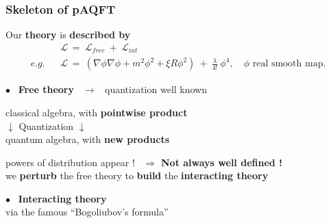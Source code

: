 \documentclass[9pt]{beamer}
\newcommand{\Lcal}{\mathcal{L}}
\begin{document}
\begin{frame}

\frametitle{Skeleton of pAQFT}

\vfill

Our \textbf{theory} is \textbf{described by}
\begin{eqnarray*}
&& \Lcal \ = \ \Lcal_{free} \ + \ \Lcal_{int} \\
e.g. && \Lcal \ = \ \left( \nabla \phi \nabla \phi + m^2 \phi^2 + \xi R \phi^2 \right) \ + \ \frac{\lambda}{4!} \ \phi^4 , \quad \phi \mbox{ real smooth map}.
\end{eqnarray*}

\vfill

$\bullet$ \ \textbf{Free theory} \ $\to$ \ quantization well known \\
\vspace*{-10pt}
\begin{block}{\vspace*{-3ex}}
\vspace*{-10pt}
\begin{center}
classical algebra, with \textbf{pointwise product} \\
$\downarrow$ Quantization $\downarrow$ \\
quantum algebra, with \textbf{new products} \\
\end{center}
\vspace*{-7pt}
\end{block}
\hspace*{8pt} powers of distribution appear !  \ $\Rightarrow$ \textbf{Not always well defined !} \\[2pt]
\hspace*{8pt} we \textbf{perturb} the free theory to \textbf{build} the \textbf{interacting theory}

\vfill

$\bullet$ \ \textbf{Interacting theory} \\

\hspace*{8pt} via the famous ``Bogoliubov's formula'' \\ 

\vfill

\end{frame}

\end{document}
